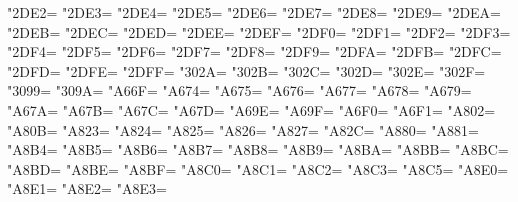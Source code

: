 \XeTeXcharclass"2DE2=\KclassCM
\XeTeXcharclass"2DE3=\KclassCM
\XeTeXcharclass"2DE4=\KclassCM
\XeTeXcharclass"2DE5=\KclassCM
\XeTeXcharclass"2DE6=\KclassCM
\XeTeXcharclass"2DE7=\KclassCM
\XeTeXcharclass"2DE8=\KclassCM
\XeTeXcharclass"2DE9=\KclassCM
\XeTeXcharclass"2DEA=\KclassCM
\XeTeXcharclass"2DEB=\KclassCM
\XeTeXcharclass"2DEC=\KclassCM
\XeTeXcharclass"2DED=\KclassCM
\XeTeXcharclass"2DEE=\KclassCM
\XeTeXcharclass"2DEF=\KclassCM
\XeTeXcharclass"2DF0=\KclassCM
\XeTeXcharclass"2DF1=\KclassCM
\XeTeXcharclass"2DF2=\KclassCM
\XeTeXcharclass"2DF3=\KclassCM
\XeTeXcharclass"2DF4=\KclassCM
\XeTeXcharclass"2DF5=\KclassCM
\XeTeXcharclass"2DF6=\KclassCM
\XeTeXcharclass"2DF7=\KclassCM
\XeTeXcharclass"2DF8=\KclassCM
\XeTeXcharclass"2DF9=\KclassCM
\XeTeXcharclass"2DFA=\KclassCM
\XeTeXcharclass"2DFB=\KclassCM
\XeTeXcharclass"2DFC=\KclassCM
\XeTeXcharclass"2DFD=\KclassCM
\XeTeXcharclass"2DFE=\KclassCM
\XeTeXcharclass"2DFF=\KclassCM
\XeTeXcharclass"302A=\KclassCM
\XeTeXcharclass"302B=\KclassCM
\XeTeXcharclass"302C=\KclassCM
\XeTeXcharclass"302D=\KclassCM
\XeTeXcharclass"302E=\KclassCM
\XeTeXcharclass"302F=\KclassCM
\XeTeXcharclass"3099=\KclassCM
\XeTeXcharclass"309A=\KclassCM
\XeTeXcharclass"A66F=\KclassCM
\XeTeXcharclass"A674=\KclassCM
\XeTeXcharclass"A675=\KclassCM
\XeTeXcharclass"A676=\KclassCM
\XeTeXcharclass"A677=\KclassCM
\XeTeXcharclass"A678=\KclassCM
\XeTeXcharclass"A679=\KclassCM
\XeTeXcharclass"A67A=\KclassCM
\XeTeXcharclass"A67B=\KclassCM
\XeTeXcharclass"A67C=\KclassCM
\XeTeXcharclass"A67D=\KclassCM
\XeTeXcharclass"A69E=\KclassCM
\XeTeXcharclass"A69F=\KclassCM
\XeTeXcharclass"A6F0=\KclassCM
\XeTeXcharclass"A6F1=\KclassCM
\XeTeXcharclass"A802=\KclassCM
\XeTeXcharclass"A80B=\KclassCM
\XeTeXcharclass"A823=\KclassCM
\XeTeXcharclass"A824=\KclassCM
\XeTeXcharclass"A825=\KclassCM
\XeTeXcharclass"A826=\KclassCM
\XeTeXcharclass"A827=\KclassCM
\XeTeXcharclass"A82C=\KclassCM
\XeTeXcharclass"A880=\KclassCM
\XeTeXcharclass"A881=\KclassCM
\XeTeXcharclass"A8B4=\KclassCM
\XeTeXcharclass"A8B5=\KclassCM
\XeTeXcharclass"A8B6=\KclassCM
\XeTeXcharclass"A8B7=\KclassCM
\XeTeXcharclass"A8B8=\KclassCM
\XeTeXcharclass"A8B9=\KclassCM
\XeTeXcharclass"A8BA=\KclassCM
\XeTeXcharclass"A8BB=\KclassCM
\XeTeXcharclass"A8BC=\KclassCM
\XeTeXcharclass"A8BD=\KclassCM
\XeTeXcharclass"A8BE=\KclassCM
\XeTeXcharclass"A8BF=\KclassCM
\XeTeXcharclass"A8C0=\KclassCM
\XeTeXcharclass"A8C1=\KclassCM
\XeTeXcharclass"A8C2=\KclassCM
\XeTeXcharclass"A8C3=\KclassCM
\XeTeXcharclass"A8C5=\KclassCM
\XeTeXcharclass"A8E0=\KclassCM
\XeTeXcharclass"A8E1=\KclassCM
\XeTeXcharclass"A8E2=\KclassCM
\XeTeXcharclass"A8E3=\KclassCM
